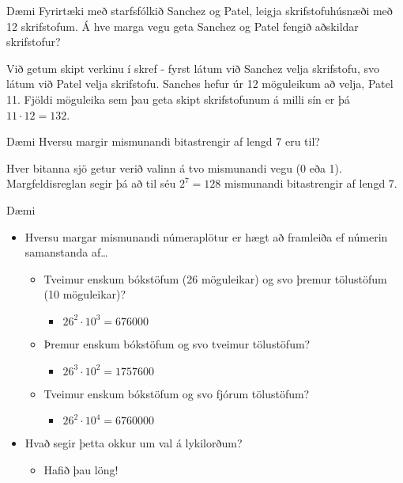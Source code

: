 \documentclass{beamer}
\begin{document}
\begin{frame}{Dæmi}
Fyrirtæki með starfsfólkið Sanchez og Patel, leigja skrifstofuhúsnæði með 12 skrifstofum. Á hve marga vegu geta Sanchez og Patel fengið aðskildar skrifstofur?
\pause

\vspace{1cm}
Við getum skipt verkinu í skref - fyrst látum við Sanchez velja skrifstofu, svo látum við Patel velja skrifstofu. Sanches hefur úr 12 möguleikum að velja, Patel 11. Fjöldi möguleika sem þau geta skipt skrifstofunum á milli sín er þá $11 \cdot 12 = 132$.
\end{frame}

\begin{frame}{Dæmi}
Hversu margir mismunandi bitastrengir af lengd 7 eru til?
\pause

\vspace{1cm}
Hver bitanna sjö getur verið valinn á tvo mismunandi vegu (0 eða 1). Margfeldisreglan segir þá að til séu $2^7 = 128$ mismunandi bitastrengir af lengd 7.
\end{frame}

\begin{frame}{Dæmi}
\begin{itemize}
 \item Hversu margar mismunandi númeraplötur er hægt að framleiða ef númerin samanstanda af\ldots
 \begin{itemize}
  \item Tveimur enskum bókstöfum (26 möguleikar) og svo þremur tölustöfum (10 möguleikar)? \pause
  \begin{itemize}
   \item $26^2 \cdot 10^3 = 676000$
  \end{itemize}
  \item Þremur enskum bókstöfum og svo tveimur tölustöfum? \pause
  \begin{itemize}
   \item $26^3 \cdot 10^2 = 1757600$
  \end{itemize}
  \item Tveimur enskum bókstöfum og svo fjórum tölustöfum? \pause
  \begin{itemize}
   \item $26^2 \cdot 10^4 = 6760000$
  \end{itemize}
 \end{itemize}
 \item Hvað segir þetta okkur um val á lykilorðum? \pause
 \begin{itemize}
  \item Hafið þau löng!
 \end{itemize}
\end{itemize}
\end{frame}
\end{document}

